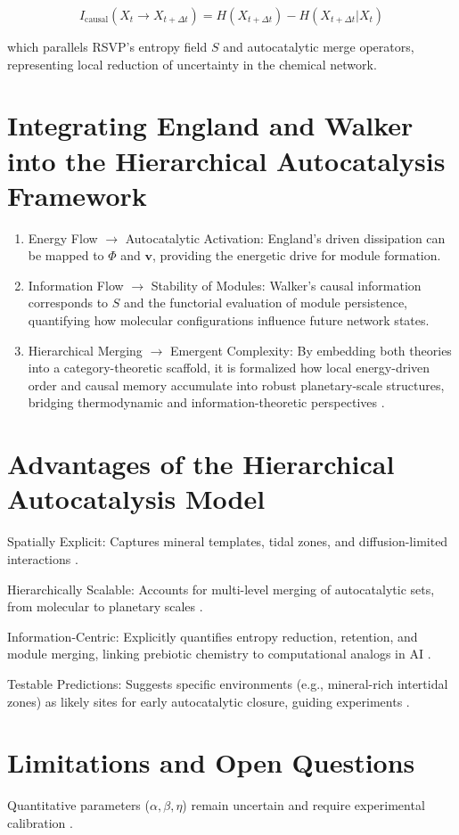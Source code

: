 \documentclass{book}
\begin{document}
\[I_\text{causal}(X_{t} \to X_{t+\Delta t}) = H(X_{t+\Delta t}) - H(X_{t+\Delta t} | X_t)\]

which parallels RSVP’s entropy field $S$ and autocatalytic merge operators, representing local reduction of uncertainty in the chemical network.

\section{Integrating England and Walker into the Hierarchical Autocatalysis Framework}
\begin{enumerate}
\item Energy Flow $\to$ Autocatalytic Activation: England’s driven dissipation can be mapped to $\Phi$ and $\mathbf{v}$, providing the energetic drive for module formation.
\item Information Flow $\to$ Stability of Modules: Walker’s causal information corresponds to $S$ and the functorial evaluation of module persistence, quantifying how molecular configurations influence future network states.
\item Hierarchical Merging $\to$ Emergent Complexity: By embedding both theories into a category-theoretic scaffold, it is formalized how local energy-driven order and causal memory accumulate into robust planetary-scale structures, bridging thermodynamic and information-theoretic perspectives \citep{hordijk2013}.
\end{enumerate}

\section{Advantages of the Hierarchical Autocatalysis Model}
Spatially Explicit: Captures mineral templates, tidal zones, and diffusion-limited interactions \citep{barge2022}.

Hierarchically Scalable: Accounts for multi-level merging of autocatalytic sets, from molecular to planetary scales \citep{peng2022}.

Information-Centric: Explicitly quantifies entropy reduction, retention, and module merging, linking prebiotic chemistry to computational analogs in AI \citep{scalinghypothesis}.

Testable Predictions: Suggests specific environments (e.g., mineral-rich intertidal zones) as likely sites for early autocatalytic closure, guiding experiments \citep{sokolskyi2024}.

\section{Limitations and Open Questions}
Quantitative parameters ($\alpha, \beta, \eta$) remain uncertain and require experimental calibration \citep{matreux2024}.
\end{document}
